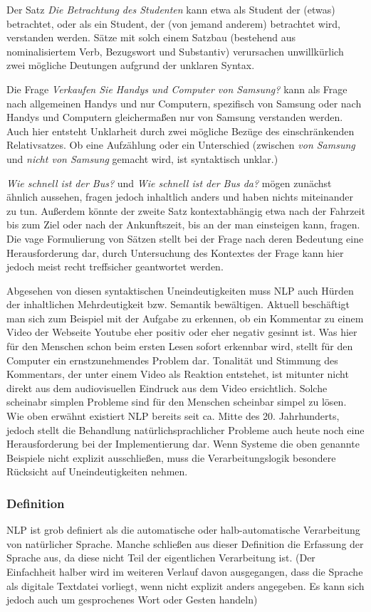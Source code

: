 \documentclass[12pt]{article}
\begin{document}
Der Satz \textit{Die Betrachtung des Studenten} kann etwa als Student der (etwas) betrachtet, oder als ein Student, der (von jemand anderem) betrachtet wird, verstanden werden. Sätze mit solch einem Satzbau (bestehend aus nominalisiertem Verb, Bezugswort und Substantiv) verursachen unwillkürlich zwei mögliche Deutungen aufgrund der unklaren Syntax.

Die Frage \textit{Verkaufen Sie Handys und Computer von Samsung?} kann als Frage nach allgemeinen Handys und nur Computern, spezifisch von Samsung oder nach Handys und Computern gleichermaßen nur von Samsung verstanden werden. Auch hier entsteht Unklarheit durch zwei mögliche Bezüge des einschränkenden Relativsatzes. Ob eine Aufzählung oder ein Unterschied (zwischen \textit{von Samsung} und \textit{nicht von Samsung} gemacht wird, ist syntaktisch unklar.)

\textit{Wie schnell ist der Bus?} und \textit{Wie schnell ist der Bus da?} mögen zunächst ähnlich aussehen, fragen jedoch inhaltlich anders und haben nichts miteinander zu tun. Außerdem könnte der zweite Satz kontextabhängig etwa nach der Fahrzeit bis zum Ziel oder nach der Ankunftszeit, bis an der man einsteigen kann, fragen. Die vage Formulierung von Sätzen stellt bei der Frage nach deren Bedeutung eine Herausforderung dar, durch Untersuchung des Kontextes der Frage kann hier jedoch meist recht treffsicher geantwortet werden.

Abgesehen von diesen syntaktischen Uneindeutigkeiten muss NLP auch Hürden der inhaltlichen Mehrdeutigkeit bzw. Semantik bewältigen. Aktuell beschäftigt man sich zum Beispiel mit der Aufgabe zu erkennen, ob ein Kommentar zu einem Video der Webseite Youtube eher positiv oder eher negativ gesinnt ist. Was hier für den Menschen schon beim ersten Lesen sofort erkennbar wird, stellt für den Computer ein ernstzunehmendes Problem dar. Tonalität und Stimmung des Kommentars, der unter einem Video als Reaktion entstehet, ist mitunter nicht direkt aus dem audiovisuellen Eindruck aus dem Video ersichtlich. 
Solche scheinabr simplen Probleme sind für den Menschen scheinbar simpel zu lösen. Wie oben erwähnt existiert NLP bereits seit ca. Mitte des 20. Jahrhunderts, jedoch stellt die Behandlung natürlichsprachlicher Probleme auch heute noch eine Herausforderung bei der Implementierung dar. Wenn Systeme die oben genannte Beispiele nicht explizit ausschließen, muss die Verarbeitungslogik besondere Rücksicht auf Uneindeutigkeiten nehmen.

\subsubsection{Definition}
NLP ist grob definiert als die automatische oder halb-automatische Verarbeitung von natürlicher Sprache. Manche schließen aus dieser Definition die Erfassung der Sprache aus, da diese nicht Teil der eigentlichen Verarbeitung ist. (Der Einfachheit halber wird im weiteren Verlauf davon ausgegangen, dass die Sprache als digitale Textdatei vorliegt, wenn nicht explizit anders angegeben. Es kann sich jedoch auch um gesprochenes Wort oder Gesten handeln)
\end{document}
